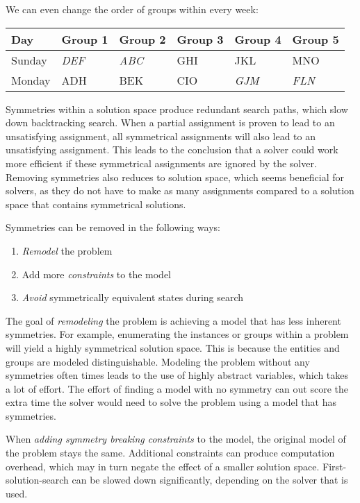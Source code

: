 \documentclass[a4paper]{scrartcl}
\begin{document}
We can even change the order of groups within every week:

\begin{table}[h]
\centering
\begin{tabular}{ l | l  l  l l  l }
Day & Group 1 & Group 2 & Group 3 & Group 4 & Group 5 \\
\hline
Sunday & \emph{DEF} & \emph{ABC} & GHI & JKL & MNO \\
Monday & ADH  & BEK & CIO & \emph{GJM} & \emph{FLN}\\
\end{tabular}
\end{table}

Symmetries within a solution space produce redundant search paths, which slow down backtracking search. When a partial assignment is proven to lead to an unsatisfying assignment, all symmetrical assignments will also lead to an unsatisfying assignment. This leads to the conclusion that a solver could work more efficient if these symmetrical assignments are ignored by the solver. Removing symmetries also reduces to solution space, which seems beneficial for solvers, as they do not have to make as many assignments compared to a solution space that contains symmetrical solutions.


Symmetries can be removed in the following ways:

\begin{enumerate}
\item \emph{Remodel} the problem
\item Add more \emph{constraints} to the model
\item \emph{Avoid} symmetrically equivalent states during search
\end{enumerate}

The goal of \emph{remodeling} the problem is achieving a model that has less inherent symmetries. For example, enumerating the instances or groups within a problem will yield a highly symmetrical solution space. This is because the entities and groups are modeled distinguishable. Modeling the problem without any symmetries often times leads to the use of highly abstract variables, which takes a lot of effort. The effort of finding a model with no symmetry can out score the extra time the solver would need to solve the problem using a model that has symmetries.

When \emph{adding symmetry breaking constraints} to the model, the original model of the problem stays the same. Additional constraints can produce computation overhead, which may in turn negate the effect of a smaller solution space. First-solution-search can be slowed down significantly, depending on the solver that is used\cite{Prestwich}.
\end{document}
